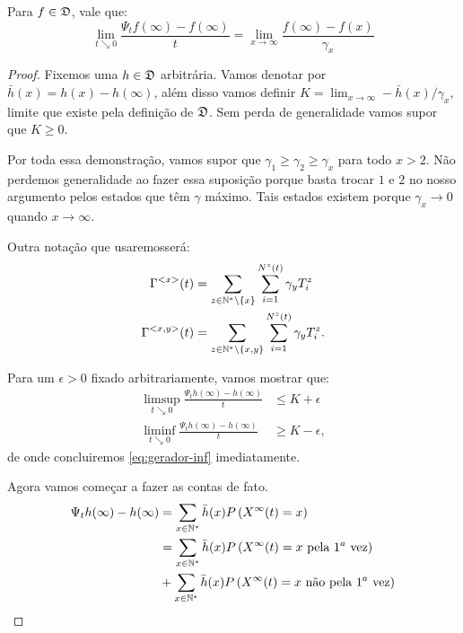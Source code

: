 \begin{proposicao}
  \label{prop:gerador-inf}
  Para $f \in {\mathfrak{D}}$, vale que:
  \begin{equation}
    \label{eq:gerador-inf}
    \lim_{t \searrow 0} \frac{\Psi_t f(\infty) - f(\infty)}{t} =
    \lim_{x \to \infty} \frac{f(\infty) - f(x)}{\gamma_x}
  \end{equation}
\end{proposicao}
\begin{proof}
  Fixemos uma $h \in {\mathfrak{D}}$ arbitrária. Vamos denotar por $\bar{h}(x) =
  h(x) - h(\infty)$, além disso vamos definir $K = \lim_{x \to \infty}
  -\bar{h}(x)/\gamma_x$, limite que existe pela definição de
  ${\mathfrak{D}}$. Sem perda de generalidade vamos supor que $K \geq 0$.

  Por toda essa demonstração, vamos supor que $\gamma_1 \geq \gamma_2
  \geq \gamma_x$ para todo $x > 2$. Não perdemos generalidade ao fazer
  essa suposição porque basta trocar $1$ e $2$ no nosso argumento pelos
  estados que têm $\gamma$ máximo. Tais estados existem porque $\gamma_x
  \to 0$ quando $x \to \infty$.

  Outra notação que usaremosserá:
  \begin{align*}
    \Gamma^{<x>}(t) &= \sum_{z\in{\mathbb{N^*}}\setminus\{x\}} \sum_{i =
      1}^{N^z(t)} \gamma_y T^z_i \\
    \Gamma^{<x, y>}(t) &= \sum_{z\in{\mathbb{N^*}}\setminus\{x,y\}} \sum_{i =
      1}^{N^z(t)} \gamma_y T^z_i .
  \end{align*}


  Para um $\epsilon > 0$ fixado arbitrariamente, vamos mostrar que:
  \begin{align}
    \label{eq:gerador-inf-sup}
    \limsup_{t \searrow 0} \frac{\Psi_t h(\infty) - h(\infty)}{t} 
    &\leq K + \epsilon\\
    \label{eq:gerador-inf-inf}
    \liminf_{t \searrow 0} \frac{\Psi_t h(\infty) - h(\infty)}{t} 
    &\geq K - \epsilon,
  \end{align}
  de onde concluiremos \eqref{eq:gerador-inf} imediatamente.

  Agora vamos começar a fazer as contas de fato.
  \begin{align*}
    \Psi_t h (\infty) - h(\infty) &=
    \sum_{x \in {\mathbb{N^*}}} \bar{h}(x) P\left( X^\infty(t) = x \right)\\
    &= 
    \sum_{x \in {\mathbb{N^*}}} \bar{h}(x) P\left( X^\infty(t) = x \text{ pela } 1^{a}
        \text{ vez}\right)\\
    &+ \sum_{x \in {\mathbb{N^*}}} \bar{h}(x) P\left( X^\infty(t) = x \text{ não pela
      } 1^a \text{ vez}\right)
  \end{align*}


\end{proof}
